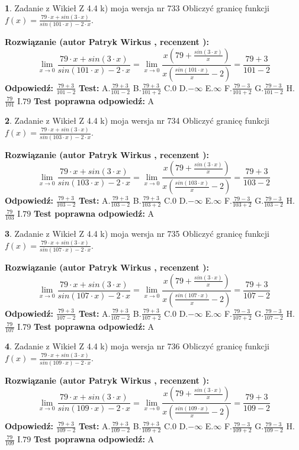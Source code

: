 \documentclass[12pt, a4paper]{article}
\theoremstyle{definition} %
\newtheorem{zad}{}
\newcommand{\zadStart}[1]{\begin{zad}#1\newline}
\newcommand{\zadStop}{\end{zad}}
\newcommand{\rozwStart}[2]{\noindent \textbf{Rozwiązanie (autor #1 , recenzent #2): }\newline}
\newcommand{\rozwStop}{\newline}
\newcommand{\odpStart}{\noindent \textbf{Odpowiedź:}\newline}
\newcommand{\odpStop}{\newline}
\newcommand{\testStart}{\noindent \textbf{Test:}\newline}
\newcommand{\testStop}{\newline}
\newcommand{\kluczStart}{\noindent \textbf{Test poprawna odpowiedź:}\newline}
\newcommand{\kluczStop}{\newline}
\begin{document}
\zadStart{Zadanie z Wikieł Z 4.4 k) moja wersja nr 733}
Obliczyć granicę funkcji $f(x)=\frac{79\cdot x +sin(3\cdot x)}{sin(101\cdot x) -2\cdot x}$.
\zadStop
\rozwStart{Patryk Wirkus}{}
$$\lim\limits_{x\to 0}\frac{79\cdot x +sin(3\cdot x)}{sin(101\cdot x) -2\cdot x}
=\lim\limits_{x\to 0}\frac{x(79+\frac{sin(3\cdot x)}{x})}{x(\frac{sin(101\cdot x)}{x}-2)}
=\frac{79+3}{101-2}$$
\rozwStop
\odpStart
$\frac{79+3}{101-2}$
\odpStop
\testStart
A.$\frac{79+3}{101-2}$
B.$\frac{79+3}{101+2}$
C.$0$
D.$-\infty$
E.$\infty$
F.$\frac{79-3}{101+2}$
G.$\frac{79-3}{101-2}$
H.$\frac{79}{101}$
I.$79$
\testStop
\kluczStart
A
\kluczStop



\zadStart{Zadanie z Wikieł Z 4.4 k) moja wersja nr 734}
Obliczyć granicę funkcji $f(x)=\frac{79\cdot x +sin(3\cdot x)}{sin(103\cdot x) -2\cdot x}$.
\zadStop
\rozwStart{Patryk Wirkus}{}
$$\lim\limits_{x\to 0}\frac{79\cdot x +sin(3\cdot x)}{sin(103\cdot x) -2\cdot x}
=\lim\limits_{x\to 0}\frac{x(79+\frac{sin(3\cdot x)}{x})}{x(\frac{sin(103\cdot x)}{x}-2)}
=\frac{79+3}{103-2}$$
\rozwStop
\odpStart
$\frac{79+3}{103-2}$
\odpStop
\testStart
A.$\frac{79+3}{103-2}$
B.$\frac{79+3}{103+2}$
C.$0$
D.$-\infty$
E.$\infty$
F.$\frac{79-3}{103+2}$
G.$\frac{79-3}{103-2}$
H.$\frac{79}{103}$
I.$79$
\testStop
\kluczStart
A
\kluczStop



\zadStart{Zadanie z Wikieł Z 4.4 k) moja wersja nr 735}
Obliczyć granicę funkcji $f(x)=\frac{79\cdot x +sin(3\cdot x)}{sin(107\cdot x) -2\cdot x}$.
\zadStop
\rozwStart{Patryk Wirkus}{}
$$\lim\limits_{x\to 0}\frac{79\cdot x +sin(3\cdot x)}{sin(107\cdot x) -2\cdot x}
=\lim\limits_{x\to 0}\frac{x(79+\frac{sin(3\cdot x)}{x})}{x(\frac{sin(107\cdot x)}{x}-2)}
=\frac{79+3}{107-2}$$
\rozwStop
\odpStart
$\frac{79+3}{107-2}$
\odpStop
\testStart
A.$\frac{79+3}{107-2}$
B.$\frac{79+3}{107+2}$
C.$0$
D.$-\infty$
E.$\infty$
F.$\frac{79-3}{107+2}$
G.$\frac{79-3}{107-2}$
H.$\frac{79}{107}$
I.$79$
\testStop
\kluczStart
A
\kluczStop



\zadStart{Zadanie z Wikieł Z 4.4 k) moja wersja nr 736}
Obliczyć granicę funkcji $f(x)=\frac{79\cdot x +sin(3\cdot x)}{sin(109\cdot x) -2\cdot x}$.
\zadStop
\rozwStart{Patryk Wirkus}{}
$$\lim\limits_{x\to 0}\frac{79\cdot x +sin(3\cdot x)}{sin(109\cdot x) -2\cdot x}
=\lim\limits_{x\to 0}\frac{x(79+\frac{sin(3\cdot x)}{x})}{x(\frac{sin(109\cdot x)}{x}-2)}
=\frac{79+3}{109-2}$$
\rozwStop
\odpStart
$\frac{79+3}{109-2}$
\odpStop
\testStart
A.$\frac{79+3}{109-2}$
B.$\frac{79+3}{109+2}$
C.$0$
D.$-\infty$
E.$\infty$
F.$\frac{79-3}{109+2}$
G.$\frac{79-3}{109-2}$
H.$\frac{79}{109}$
I.$79$
\testStop
\kluczStart
A
\kluczStop
\end{document}
